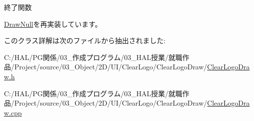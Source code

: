 終了関数 



\mbox{\hyperlink{class_draw_null_a12d44e341c7364b5ab9cdd661dc16187}{Draw\+Null}}を再実装しています。



このクラス詳解は次のファイルから抽出されました\+:\begin{DoxyCompactItemize}
\item 
C\+:/\+H\+A\+L/\+P\+G関係/03\+\_\+作成プログラム/03\+\_\+\+H\+A\+L授業/就職作品/\+Project/source/03\+\_\+\+Object/2\+D/\+U\+I/\+Clear\+Logo/\+Clear\+Logo\+Draw/\mbox{\hyperlink{_clear_logo_draw_8h}{Clear\+Logo\+Draw.\+h}}\item 
C\+:/\+H\+A\+L/\+P\+G関係/03\+\_\+作成プログラム/03\+\_\+\+H\+A\+L授業/就職作品/\+Project/source/03\+\_\+\+Object/2\+D/\+U\+I/\+Clear\+Logo/\+Clear\+Logo\+Draw/\mbox{\hyperlink{_clear_logo_draw_8cpp}{Clear\+Logo\+Draw.\+cpp}}\end{DoxyCompactItemize}
